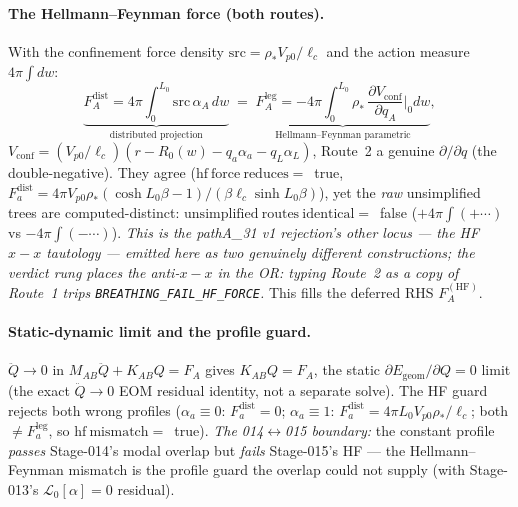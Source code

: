 \paragraph{The Hellmann--Feynman force (both routes).}
With the confinement force density \(\mathrm{src}=\rho_\ast V_{p0}/\ell_c\) and the
action measure \(4\pi\!\int dw\):
\[
  \underbrace{F^{\mathrm{dist}}_A=4\pi\!\int_0^{L_0}\!\mathrm{src}\,\alpha_A\,dw}_{\text{distributed projection}}
  \;=\;
  \underbrace{F^{\mathrm{leg}}_A=-4\pi\!\int_0^{L_0}\!\rho_\ast\,\frac{\partial V_{\mathrm{conf}}}{\partial q_A}\Big|_{0}dw}_{\text{Hellmann--Feynman parametric}},
\]
\(V_{\mathrm{conf}}=(V_{p0}/\ell_c)(r-R_0(w)-q_a\alpha_a-q_L\alpha_L)\), Route~2 a
genuine \(\partial/\partial q\) (the double-negative). They agree
(\(\mathrm{hf\ force\ reduces}=\)~true, \(F^{\mathrm{dist}}_a=4\pi V_{p0}\rho_\ast(\cosh
L_0\beta-1)/(\beta\ell_c\sinh L_0\beta)\)), yet the \emph{raw} unsimplified trees are
computed-distinct: \(\mathrm{unsimplified\ routes\ identical}=\)~false
(\(+4\pi\!\int(+\cdots)\) vs \(-4\pi\!\int(-\cdots)\)). \emph{This is the
pathA\_31 v1 rejection's other locus --- the HF \(x\!-\!x\) tautology --- emitted here
as two genuinely different constructions; the verdict rung places the anti-\(x\!-\!x\)
in the OR: typing Route~2 as a copy of Route~1 trips
\texttt{BREATHING\_FAIL\_HF\_FORCE}.} This fills the deferred RHS
\(F_A^{(\mathrm{HF})}\).

\paragraph{Static-dynamic limit and the profile guard.}
\(\ddot Q\to0\) in \(M_{AB}\ddot Q+K_{AB}Q=F_A\) gives \(K_{AB}Q=F_A\), the static
\(\partial E_{\mathrm{geom}}/\partial Q=0\) limit (the exact \(\ddot Q\to0\) EOM
residual identity, not a separate solve). The HF guard rejects both wrong profiles
(\(\alpha_a\equiv0\): \(F^{\mathrm{dist}}_a=0\); \(\alpha_a\equiv1\):
\(F^{\mathrm{dist}}_a=4\pi L_0 V_{p0}\rho_\ast/\ell_c\); both \(\ne F^{\mathrm{leg}}_a\),
so \(\mathrm{hf\ mismatch}=\)~true). \emph{The 014\(\leftrightarrow\)015 boundary:} the
constant profile \emph{passes} Stage-014's modal overlap but \emph{fails} Stage-015's
HF --- the Hellmann--Feynman mismatch is the profile guard the overlap could not
supply (with Stage-013's \(\mathcal{L}_0[\alpha]=0\) residual).

